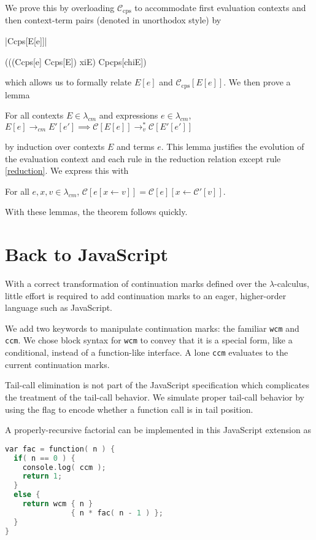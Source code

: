 \documentclass{llncs}
\newcommand{\lc}[0]{$\lambda$-calculus}
\newcommand{\lvrrs}[0]{\rightarrow_v^{*}}
\newcommand{\cmrr}[0]{\rightarrow_{cm}}
\newcommand{\C}[1]{\mathcal{C}[#1]}
\newcommand{\Cp}[1]{\mathcal{C}'[#1]}
\newcommand{\Ccps}[1]{\mathcal{C}_{\mathrm{cps}}[#1]}
\begin{document}
We prove this by overloading $\mathcal{C}_{\mathrm{cps}}$ to accommodate first evaluation contexts and then context-term pairs (denoted in unorthodox style) by
\begin{schemedefn}{\scheme|Ccps[E[e]]|}
\begin{schemedisplay}
(((Ccps[e] Ccps[E]) xiE) Cpcps[chiE])
\end{schemedisplay}
\end{schemedefn}
\noindent
which allows us to formally relate $E[e]$ and $\Ccps{E[e]}$. We then prove a lemma
\begin{lemma}[Simulation]
For all contexts $E\in\lambda_{cm}$ and expressions $e\in\lambda_{cm}$, $E[e]\cmrr E'[e']\implies\C{E[e]}\lvrrs\C{E'[e']}$
\end{lemma}
by induction over contexts $E$ and terms $e$. This lemma justifies the evolution of the evaluation context and each rule in the reduction relation except rule \ref{reduction}. We express this with
\begin{lemma}[Substitution]
\label{lem:substitution}
For all $e,x,v\in\lambda_{cm}$, $\C{e[x\leftarrow v]}=\C{e}[x\leftarrow \Cp{v}]$.
\end{lemma}

With these lemmas, the theorem follows quickly.

\section{Back to JavaScript}
\label{sec-javascript}

With a correct transformation of continuation marks defined over the \lc, little effort is required to add continuation marks to an eager, higher-order language such as JavaScript.

We add two keywords to manipulate continuation marks: the familiar \texttt{wcm} and \texttt{ccm}. We chose block syntax for \texttt{wcm} to convey that it is a special form, like a conditional, instead of a function-like interface. A lone \texttt{ccm} evaluates to the current continuation marks.

Tail-call elimination is not part of the JavaScript specification which complicates the treatment of the tail-call behavior. We simulate proper tail-call behavior by using the flag to encode whether a function call is in tail position.

A properly-recursive factorial can be implemented in this JavaScript extension as
\begin{lstlisting}[language=C,morekeywords={var,function,wcm,ccm,true,false}]
var fac = function( n ) {
  if( n == 0 ) {
    console.log( ccm );
    return 1;
  }
  else {
    return wcm { n }
               { n * fac( n - 1 ) };
  }
}
\end{lstlisting}
\end{document}
